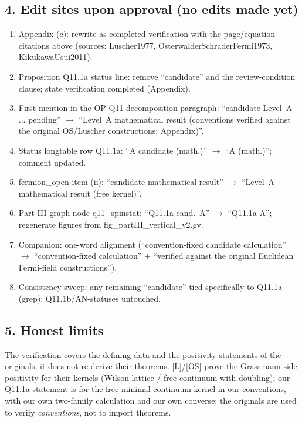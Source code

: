 \subsection*{4. Edit sites upon approval (no edits made yet)}
\begin{enumerate}
  \item Appendix (c): rewrite as completed verification with the
    page/equation citations above (sources: Luscher1977,
    OsterwalderSchraderFermi1973, KikukawaUsui2011).
  \item Proposition Q11.1a status line: remove ``candidate'' and
    the review-condition clause; state verification completed
    (Appendix).
  \item First mention in the OP-Q11 decomposition paragraph:
    ``candidate Level~A ... pending'' $\to$ ``Level~A mathematical
    result (conventions verified against the original OS/L\"uscher
    constructions; Appendix)''.
  \item Status longtable row Q11.1a: ``A candidate (math.)'' $\to$
    ``A (math.)''; comment updated.
  \item fermion\_open item (ii): ``candidate mathematical result''
    $\to$ ``Level~A mathematical result (free kernel)''.
  \item Part III graph node q11\_spinstat: ``Q11.1a cand.~A'' $\to$
    ``Q11.1a A''; regenerate figures from
    fig\_partIII\_vertical\_v2.gv.
  \item Companion: one-word alignment (``convention-fixed candidate
    calculation'' $\to$ ``convention-fixed calculation'' +
    ``verified against the original Euclidean Fermi-field
    constructions'').
  \item Consistency sweep: any remaining ``candidate'' tied
    specifically to Q11.1a (grep); Q11.1b/AN-statuses untouched.
\end{enumerate}

\subsection*{5. Honest limits}
The verification covers the defining data and the positivity
statements of the originals; it does not re-derive their theorems.
[L]/[OS] prove the Grassmann-side positivity for their kernels
(Wilson lattice / free continuum with doubling); our Q11.1a
statement is for the free minimal continuum kernel in our
conventions, with our own two-family calculation and our own
converse; the originals are used to verify \emph{conventions},
not to import theorems.
